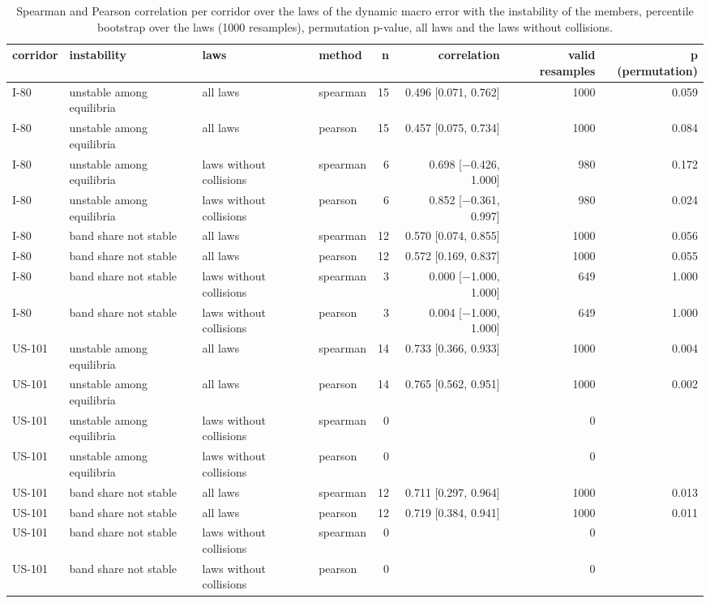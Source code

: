 \begin{table}[htbp]
\centering
\caption{Spearman and Pearson correlation per corridor over the laws of the dynamic macro error with the instability of the members, percentile bootstrap over the laws (1000 resamples), permutation p-value, all laws and the laws without collisions.}
\label{tab:macro-error-dynamic-correlation}
\small
\begin{tabular}{llllrrrr}
\toprule
corridor & instability & laws & method & n & correlation & valid resamples & p (permutation) \\
\midrule
I-80 & unstable among equilibria & all laws & spearman & 15 & 0.496 [0.071, 0.762] & 1000 & 0.059 \\
I-80 & unstable among equilibria & all laws & pearson & 15 & 0.457 [0.075, 0.734] & 1000 & 0.084 \\
I-80 & unstable among equilibria & laws without collisions & spearman & 6 & 0.698 [$-$0.426, 1.000] & 980 & 0.172 \\
I-80 & unstable among equilibria & laws without collisions & pearson & 6 & 0.852 [$-$0.361, 0.997] & 980 & 0.024 \\
I-80 & band share not stable & all laws & spearman & 12 & 0.570 [0.074, 0.855] & 1000 & 0.056 \\
I-80 & band share not stable & all laws & pearson & 12 & 0.572 [0.169, 0.837] & 1000 & 0.055 \\
I-80 & band share not stable & laws without collisions & spearman & 3 & 0.000 [$-$1.000, 1.000] & 649 & 1.000 \\
I-80 & band share not stable & laws without collisions & pearson & 3 & 0.004 [$-$1.000, 1.000] & 649 & 1.000 \\
US-101 & unstable among equilibria & all laws & spearman & 14 & 0.733 [0.366, 0.933] & 1000 & 0.004 \\
US-101 & unstable among equilibria & all laws & pearson & 14 & 0.765 [0.562, 0.951] & 1000 & 0.002 \\
US-101 & unstable among equilibria & laws without collisions & spearman & 0 &  & 0 &  \\
US-101 & unstable among equilibria & laws without collisions & pearson & 0 &  & 0 &  \\
US-101 & band share not stable & all laws & spearman & 12 & 0.711 [0.297, 0.964] & 1000 & 0.013 \\
US-101 & band share not stable & all laws & pearson & 12 & 0.719 [0.384, 0.941] & 1000 & 0.011 \\
US-101 & band share not stable & laws without collisions & spearman & 0 &  & 0 &  \\
US-101 & band share not stable & laws without collisions & pearson & 0 &  & 0 &  \\
\bottomrule
\end{tabular}
\end{table}
